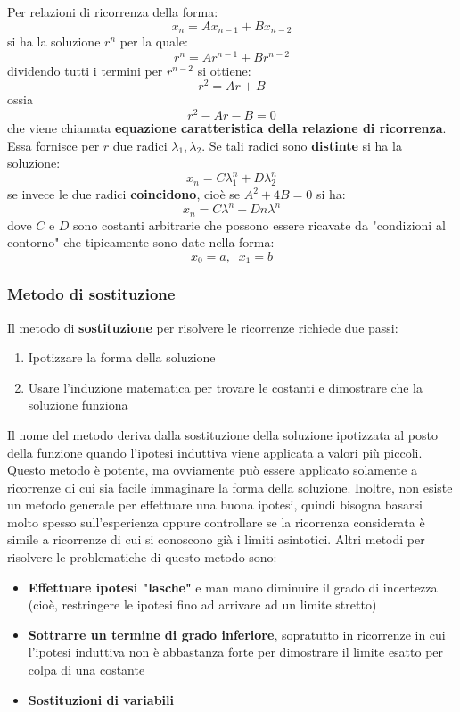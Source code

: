 \documentclass[12pt]{article}
\begin{document}
Per relazioni di ricorrenza della forma:
$$x_n = Ax_{n-1} + Bx_{n-2}$$
si ha la soluzione $r^n$ per la quale:
$$r^n = Ar^{n-1} + Br^{n-2}$$
dividendo tutti i termini per $r^{n-2}$ si ottiene:
$$r^2 = Ar + B$$
ossia
$$r^2 - Ar - B = 0$$
che viene chiamata \textbf{equazione caratteristica della relazione di ricorrenza}. Essa fornisce per $r$ due radici
$\lambda_1, \lambda_2$. Se tali radici sono \textbf{distinte} si ha la soluzione:
$$x_n = C\lambda_1^n + D\lambda_2^n$$
se invece le due radici \textbf{coincidono}, cioè se $A^2 +4B = 0$ si ha:
$$x_n = C\lambda^n + Dn\lambda^n$$
dove $C$ e $D$ sono costanti arbitrarie che possono essere ricavate da "condizioni al contorno" che tipicamente
sono date nella forma:
$$x_0 = a, \; \; x_1 = b$$
\subsubsection{Metodo di sostituzione}
Il metodo di \textbf{sostituzione} per risolvere le ricorrenze richiede due passi:
\begin{enumerate}
    \item Ipotizzare la forma della soluzione
    \item Usare l'induzione matematica per trovare le costanti e dimostrare che la soluzione funziona
\end{enumerate}
Il nome del metodo deriva dalla sostituzione della soluzione ipotizzata al posto della funzione quando l'ipotesi induttiva viene
applicata a valori più piccoli. Questo metodo è potente, ma ovviamente può essere applicato solamente a ricorrenze di cui
sia facile immaginare la forma della soluzione. Inoltre, non esiste un metodo generale per effettuare una buona ipotesi, quindi bisogna
basarsi molto spesso sull'esperienza oppure controllare se la ricorrenza considerata è simile a ricorrenze di cui si conoscono già i limiti
asintotici. Altri metodi per risolvere le problematiche di questo metodo sono:
\begin{itemize}
    \item \textbf{Effettuare ipotesi "lasche"} e man mano diminuire il grado di incertezza (cioè, restringere le ipotesi fino ad arrivare ad un limite stretto)
    \item \textbf{Sottrarre un termine di grado inferiore}, sopratutto in ricorrenze in cui l'ipotesi induttiva non è abbastanza forte per dimostrare il limite esatto per colpa di una costante
    \item \textbf{Sostituzioni di variabili}
\end{itemize}
\end{document}
